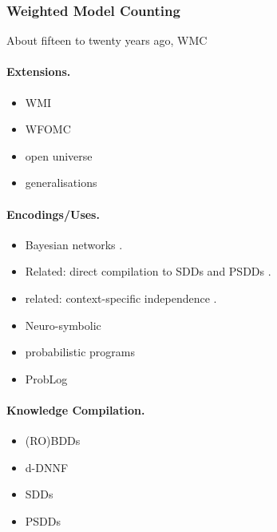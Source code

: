 \documentclass{article}
\begin{document}
\subsubsection{Weighted Model Counting}

About fifteen to twenty years ago,
WMC \cite{DBLP:journals/ai/ChaviraD08}

\paragraph{Extensions.}
\begin{itemize}
\item WMI \cite{DBLP:conf/ijcai/BellePB15}
\item WFOMC \cite{DBLP:conf/ijcai/BroeckTMDR11,DBLP:journals/cacm/GogateD16}
\item open universe \cite{DBLP:conf/aaai/Belle17}
\item generalisations
  \cite{DBLP:journals/ijar/BelleR20,DBLP:journals/japll/KimmigBR17}
\end{itemize}

\paragraph{Encodings/Uses.}
\begin{itemize}
\item Bayesian networks
  \cite{DBLP:conf/ecai/BartKLM16,DBLP:conf/ijcai/ChaviraD05,DBLP:conf/sat/ChaviraD06,DBLP:conf/kr/Darwiche02,DBLP:conf/aaai/SangBK05}.
\item Related: direct compilation to SDDs \cite{DBLP:conf/ecsqaru/ChoiKD13}
  and PSDDs \cite{shen2020modeling}.
\item related: context-specific independence \cite{DBLP:conf/uai/BoutilierFGK96}.
\item Neuro-symbolic
  \cite{DBLP:conf/icml/XuZFLB18,DBLP:journals/corr/abs-2010-11926}
\item probabilistic programs
  \cite{DBLP:journals/corr/abs-2005-09089,DBLP:journals/pacmpl/HoltzenBM20}
\item ProbLog
  \cite{DBLP:journals/tplp/FierensBRSGTJR15,DBLP:conf/aaai/VlasselaerKDMR16}
\end{itemize}

\paragraph{Knowledge Compilation.}
\begin{itemize}
\item (RO)BDDs \cite{DBLP:journals/tc/Bryant86}
\item d-DNNF \cite{DBLP:journals/jancl/Darwiche01}
\item SDDs \cite{DBLP:conf/ijcai/Darwiche11}
\item PSDDs \cite{DBLP:conf/kr/KisaBCD14}
\end{itemize}
\end{document}
